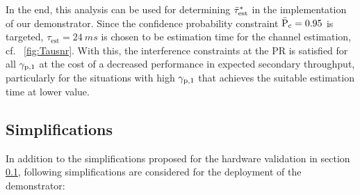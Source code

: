 In the end, this analysis can be used for determining $\tilde{\tau}^*_{\text{est}}$ in the implementation of our demonstrator. Since the confidence probability constraint $\bar{\text{P}}_{\text{c}} = 0.95$ is targeted, $\tau_\textrm{est} = \SI{24}{ms}$ is chosen to be estimation time for the channel estimation, cf. \figurename~\ref{fig:Tausnr}. With this, the interference constraints at the PR is satisfied for all ${\gamma}_{\text{p,1}}$ at the cost of a decreased performance in expected secondary throughput, particularly for the situations with high ${\gamma}_{\text{p,1}}$ that achieves the suitable estimation time at lower value.


\subsection{Simplifications}
\label{ssec:simp2}
In addition to the simplifications proposed for the hardware validation in section \ref{ssec:simp2}, following simplifications are considered for the deployment of the demonstrator: 

